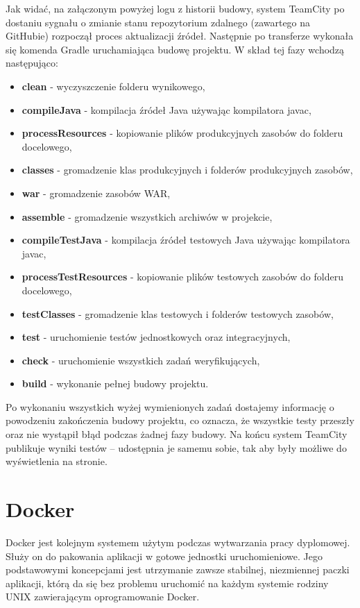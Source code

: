 Jak widać, na załączonym powyżej logu z historii budowy, system TeamCity po dostaniu sygnału o zmianie stanu repozytorium zdalnego (zawartego na GitHubie) rozpoczął proces aktualizacji źródeł. Następnie po transferze wykonała się komenda Gradle uruchamiająca budowę projektu. W skład tej fazy wchodzą następująco:
\begin{itemize}
	\item \textbf{clean} - wyczyszczenie folderu wynikowego,
	\item \textbf{compileJava} - kompilacja źródeł Java używając kompilatora javac,
	\item \textbf{processResources} - kopiowanie plików produkcyjnych zasobów do folderu docelowego,
	\item \textbf{classes} - gromadzenie klas produkcyjnych i folderów produkcyjnych zasobów,
	\item \textbf{war} - gromadzenie zasobów WAR,
	\item \textbf{assemble} - gromadzenie wszystkich archiwów w projekcie,
	\item \textbf{compileTestJava} - kompilacja źródeł testowych Java używając kompilatora javac,
	\item \textbf{processTestResources} - kopiowanie plików testowych zasobów do folderu docelowego,
	\item \textbf{testClasses} - gromadzenie klas testowych i folderów testowych zasobów,
	\item \textbf{test} - uruchomienie testów jednostkowych oraz integracyjnych,
	\item \textbf{check} - uruchomienie wszystkich zadań weryfikujących,
	\item \textbf{build} - wykonanie pełnej budowy projektu.
\end{itemize}

Po wykonaniu wszystkich wyżej wymienionych zadań dostajemy informację o powodzeniu zakończenia budowy projektu, co oznacza, że wszystkie testy przeszły oraz nie wystąpił błąd podczas żadnej fazy budowy. Na końcu system TeamCity publikuje wyniki testów -- udostępnia je samemu sobie, tak aby były możliwe do wyświetlenia na stronie.

\section{Docker}
Docker jest kolejnym systemem użytym podczas wytwarzania pracy dyplomowej. Służy on do pakowania aplikacji w gotowe jednostki uruchomieniowe. Jego podstawowymi koncepcjami jest utrzymanie zawsze stabilnej, niezmiennej paczki aplikacji, którą da się bez problemu uruchomić na każdym systemie rodziny UNIX zawierającym oprogramowanie Docker.

